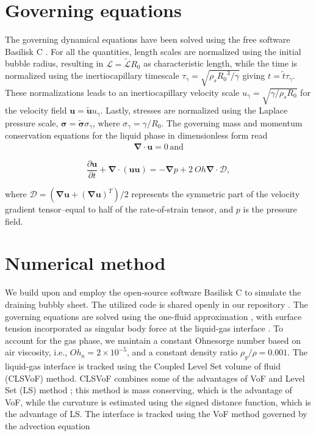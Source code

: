 \documentclass[reprint,amssymb,superscriptaddress,aps,prfluids,onecolumn]{revtex4-2}
\begin{document}
\section{Governing equations}\label{sec:gonverning}

The governing dynamical equations have been solved using the free software Basilisk C  \citep{basilliskpopinet, popinet2015quadtree}. For all the quantities, length scales are normalized using the initial bubble radius, resulting in $\mathcal{L} = \tilde{\mathcal{L}}R_0$ as characteristic length, while the time is normalized using the inertiocapillary timescale $\tau_\gamma = \sqrt{\rho_s {R_0}^3/\gamma}$ giving $t = \tilde{t}\tau_{\gamma}$. These normalizations leads to an inertiocapillary velocity scale $u_{\gamma} = \sqrt{\gamma/ \rho_{s} R_0}$ for the velocity field $\boldsymbol{u} = \tilde{\boldsymbol{u}}u_\gamma$. Lastly, stresses are normalized using the Laplace pressure scale, $\boldsymbol{\sigma} = \tilde{\boldsymbol{\sigma}}\sigma_\gamma$, where $\sigma_\gamma = \gamma/R_0$. The governing mass and momentum conservation equations for the liquid phase in dimensionless form read 
\begin{align}
	\label{eq:massconserve}
	\boldsymbol{\nabla\cdot u}=0 \, \text{and}
\end{align}

\begin{equation}
	\frac{\partial \boldsymbol{u}}{\partial t} + \boldsymbol{\nabla\cdot} \left(\boldsymbol{u}\boldsymbol{u}\right) =  -\boldsymbol{\nabla}p + 2\ Oh\boldsymbol{\nabla\cdot}\boldsymbol{\mathcal{D}}, 
	\label{eq:momconserve}
\end{equation}

\noindent where $\boldsymbol{\mathcal{D}} = \left(\boldsymbol{\nabla u} + \left( \boldsymbol{ \nabla u} \right) ^T \right)/2$ represents the symmetric part of the velocity gradient tensor--equal to half of the rate-of-strain tensor, and $p$ is the pressure field. 

\section{Numerical method}\label{sec:methods}
We build upon and employ the open-source software Basilisk C \citep{basilliskpopinet, popinet2015quadtree} to simulate the draining bubbly sheet. The utilized code is shared openly in our repository \cite{coderepository}. The governing equations are solved using the one-fluid approximation \citep{tryggvason2011direct}, with surface tension incorporated as singular body force at the liquid-gas interface \cite{brackbill1992continuum}. To account for the gas phase, we maintain a constant Ohnesorge number based on air viscosity, i.e., $Oh_a = 2 \times 10^{-5}$, and a constant density ratio $\rho_g/\rho = 0.001$. The liquid-gas interface is tracked using the Coupled Level Set volume of fluid (CLSVoF) method. CLSVoF combines some of the advantages of VoF and Level Set (LS) method \cite{sussman2000coupled, basilliskpopinet, saini2025implementation}; this method is mass conserving, which is the advantage of VoF, while the curvature is estimated using the signed distance function, which is the advantage of LS. The interface is tracked using the VoF method governed by the advection equation
\end{document}

